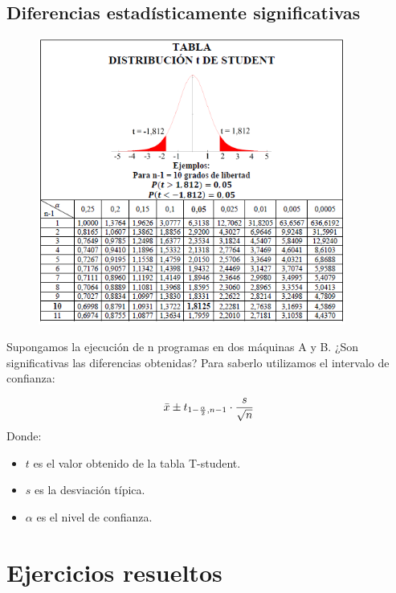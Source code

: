 \subsection{Diferencias estadísticamente significativas}
\begin{figure}[H]
    \centering
    \includegraphics[width=0.9\textwidth]{Images/tabla-t.png}
\end{figure}
Supongamos la ejecución de n programas en dos máquinas A y B. ¿Son significativas las diferencias obtenidas? Para saberlo utilizamos el intervalo de confianza:

\begin{equation}
\Large
\bar{x} \pm t_{1-\frac{\alpha}{2},n-1} \cdot \dfrac{s}{\sqrt{n}}
\end{equation}
Donde:\begin{itemize}
    \item \textbf{$t$} es el valor obtenido de la tabla T-student.
    \item \textbf{$s$} es la desviación típica.
    \item \textbf{$\alpha$} es el nivel de confianza.
\end{itemize}
\newpage
\section{Ejercicios resueltos}
